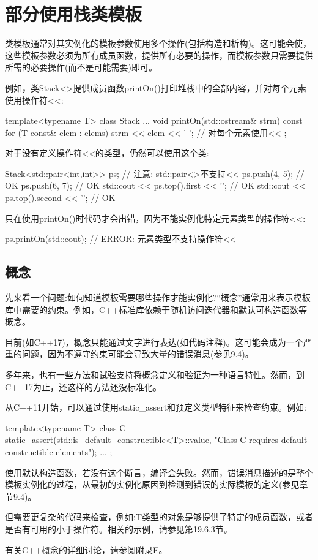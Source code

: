 \section{部分使用栈类模板}

类模板通常对其实例化的模板参数使用多个操作(包括构造和析构)。这可能会使，这些模板参数必须为所有成员函数，提供所有必要的操作，而模板参数只需要提供所需的必要操作(而不是可能需要)即可。

例如，类Stack<>提供成员函数printOn()打印堆栈中的全部内容，并对每个元素使用操作符<{}<:

\begin{cpp}
template<typename T>
class Stack {
	...
	void printOn(std::ostream& strm) const {
		for (T const& elem : elems) {
			strm << elem << ' '; // 对每个元素使用<<
		}
	}
};
\end{cpp}

对于没有定义操作符<{}<的类型，仍然可以使用这个类:

\begin{cpp}
Stack<std::pair<int,int>> ps; // 注意: std::pair<>不支持<<
ps.push({4, 5}); // OK
ps.push({6, 7}); // OK
std::cout << ps.top().first << '\n'; // OK
std::cout << ps.top().second << '\n'; // OK
\end{cpp}

只在使用printOn()时代码才会出错，因为不能实例化特定元素类型的操作符<{}<:

\begin{cpp}
ps.printOn(std::cout); // ERROR: 元素类型不支持操作符<<
\end{cpp}

\subsection{概念}

先来看一个问题:如何知道模板需要哪些操作才能实例化?“概念”通常用来表示模板库中需要的约束。例如，C++标准库依赖于随机访问迭代器和默认可构造函数等概念。

目前(如C++17)，概念只能通过文字进行表达(如代码注释)。这可能会成为一个严重的问题，因为不遵守约束可能会导致大量的错误消息(参见9.4)。

多年来，也有一些方法和试验支持将概念定义和验证为一种语言特性。然而，到C++17为止，还这样的方法还没标准化。

从C++11开始，可以通过使用static\_assert和预定义类型特征来检查约束。例如:

\begin{cpp}
template<typename T>
class C
{
	static_assert(std::is_default_constructible<T>::value,
	"Class C requires default-constructible elements");
	...
};
\end{cpp}

使用默认构造函数，若没有这个断言，编译会失败。然而，错误消息描述的是整个模板实例化的过程，从最初的实例化原因到检测到错误的实际模板的定义(参见章节9.4)。

但需要更复杂的代码来检查，例如:T类型的对象是够提供了特定的成员函数，或者是否有可用的小于操作符。相关的示例，请参见第19.6.3节。

有关C++概念的详细讨论，请参阅附录E。















